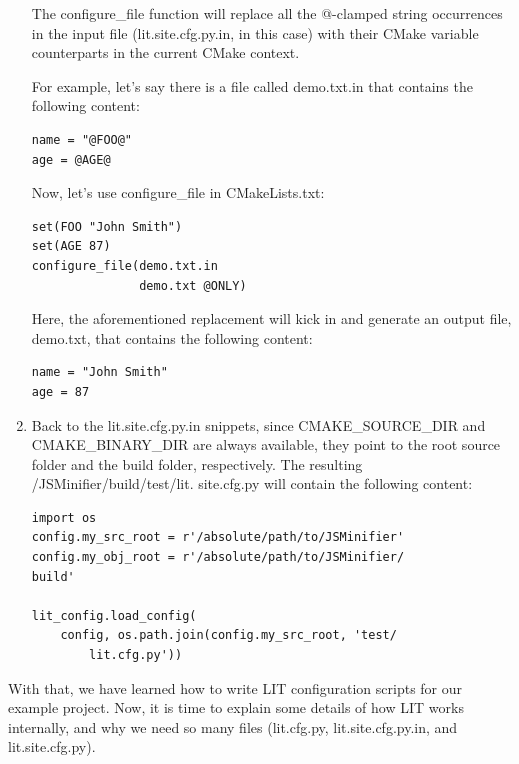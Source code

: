 \begin{enumerate}
The configure\_file function will replace all the @-clamped string occurrences in the input file (lit.site.cfg.py.in, in this case) with their CMake variable counterparts in the current CMake context.

For example, let's say there is a file called demo.txt.in that contains the following content:

\begin{lstlisting}[style=styleCMake]
name = "@FOO@"
age = @AGE@
\end{lstlisting}

Now, let's use configure\_file in CMakeLists.txt:

\begin{lstlisting}[style=styleCMake]
set(FOO "John Smith")
set(AGE 87)
configure_file(demo.txt.in
			   demo.txt @ONLY)
\end{lstlisting}

Here, the aforementioned replacement will kick in and generate an output file, demo.txt, that contains the following content:

\begin{lstlisting}[style=styleCMake]
name = "John Smith"
age = 87
\end{lstlisting}

\item Back to the lit.site.cfg.py.in snippets, since CMAKE\_SOURCE\_DIR and CMAKE\_BINARY\_DIR are always available, they point to the root source folder and the build folder, respectively. The resulting /JSMinifier/build/test/lit. site.cfg.py will contain the following content:

\begin{lstlisting}[style=stylePython]
import os
config.my_src_root = r'/absolute/path/to/JSMinifier'
config.my_obj_root = r'/absolute/path/to/JSMinifier/
build'

lit_config.load_config(
	config, os.path.join(config.my_src_root, 'test/
		lit.cfg.py'))
\end{lstlisting}

\end{enumerate}

With that, we have learned how to write LIT configuration scripts for our example project. Now, it is time to explain some details of how LIT works internally, and why we need so many files (lit.cfg.py, lit.site.cfg.py.in, and lit.site.cfg.py).


